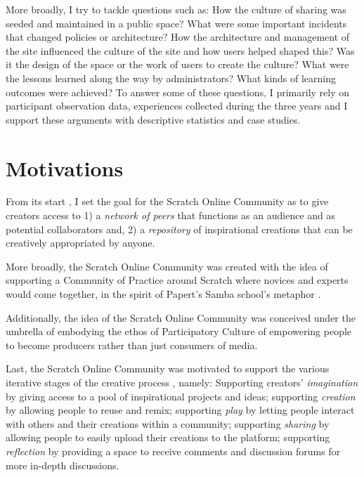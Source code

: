 More broadly, I try to tackle questions such as: How the culture of sharing was seeded and maintained in a public space? What were some important incidents that changed policies or architecture? How the architecture and management of the site influenced the culture of the site and how users helped shaped this? 
Was it the design of the space or the work of users to create the culture?
 What were the lessons learned along the way by administrators? What kinds of learning outcomes were achieved?
To answer some of these questions, I primarily rely on participant observation data, experiences collected during the three years and I support these arguments with descriptive statistics and case studies.


\section{Motivations}

From its start \citep{monroy-hernandez_scratchr:_2007,monroy-hernandez_empowering_2008}, I set the goal for the Scratch Online Community as to give creators access to 
1) a \emph{network of peers} that functions as an audience and as potential collaborators and,
2) a \emph{repository} of inspirational creations that can be creatively appropriated by anyone.

More broadly, the Scratch Online Community was created with the idea of supporting a Community of Practice around Scratch where novices and experts would come together,  in the spirit of Papert's Samba school's metaphor \citep{papert_mindstorms_1980}.

Additionally, the idea of the Scratch Online Community was conceived under the umbrella of embodying the ethos of Participatory Culture of empowering people to become producers rather than just consumers of media.

Last, the Scratch Online Community was motivated to support the various iterative stages of the creative process \citep{resnick_sowing_2008}, namely:
Supporting creators' \emph{imagination} by giving access to a pool of inspirational projects and ideas; supporting \emph{creation} by allowing people to reuse and remix; supporting \emph{play} by letting people interact with others and their creations within a community; supporting \emph{sharing} by allowing people to easily upload their creations to the platform; supporting \emph{reflection} by providing a space to receive comments and discussion forums for more in-depth discussions.

